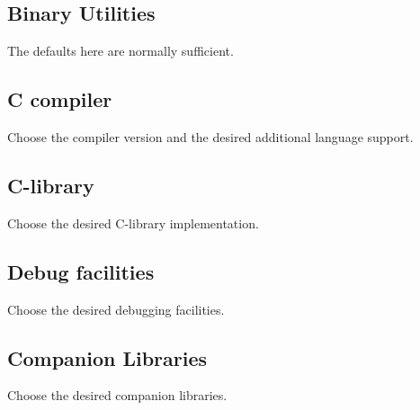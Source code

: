 \subsection{Binary Utilities}

The defaults here are normally sufficient.

\subsection{C compiler}

Choose the compiler version and the desired additional language
support.

\subsection{C-library}

Choose the desired C-library implementation.

\subsection{Debug facilities}

Choose the desired debugging facilities.

\subsection{Companion Libraries}

Choose the desired companion libraries.
